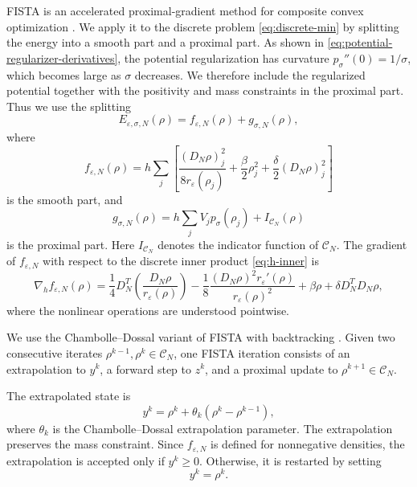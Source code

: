 \documentclass[11pt]{article}
\newcommand{\CN}{\mathcal{C}_N}
\newcommand{\eps}{\varepsilon}
\newcommand{\sig}{\sigma}
\theoremstyle{plain}
\theoremstyle{definition}
\numberwithin{equation}{section}
\begin{document}
FISTA is an accelerated proximal-gradient method for composite convex
optimization \cite{BeckTeboulle2009}. We apply it to the discrete
problem \eqref{eq:discrete-min} by splitting the energy into a smooth part and a proximal
part.
As shown in  \eqref{eq:potential-regularizer-derivatives}, the potential regularization has curvature $p_\sig''(0)=1/\sig$, which
becomes large as $\sig$ decreases. 
We therefore include the regularized
potential together with the positivity and mass constraints in the
proximal part. Thus we use the splitting
\begin{equation}
\label{eq:f-plus-g}
E_{\eps,\sig,N}(\rho)
=
f_{\eps,N}(\rho)+g_{\sig,N}(\rho),
\end{equation}
where
\begin{equation}
\label{eq:smooth-part}
f_{\eps,N}(\rho)
=
h\sum_j
\left[
\frac{(D_N\rho)_j^2}{8r_\eps(\rho_j)}
+\frac{\beta}{2}\rho_j^2
+\frac{\delta}{2}(D_N\rho)_j^2
\right]
\end{equation}
is the smooth part, and
\begin{equation}
\label{eq:prox-part}
g_{\sig,N}(\rho)
=
h\sum_j V_jp_\sig(\rho_j)
+
I_{\CN}(\rho)
\end{equation}
is the proximal part. Here $I_{\CN}$ denotes the indicator function
of $\CN$.
The gradient of $f_{\eps,N}$ with respect to the discrete inner
product \eqref{eq:h-inner} is
\begin{equation}
\label{eq:smooth-gradient}
\nabla_h f_{\eps,N}(\rho)
=
\frac14D_N^T
\left(
\frac{D_N\rho}{r_\eps(\rho)}
\right)
-\frac18
\frac{(D_N\rho)^2r_\eps'(\rho)}
     {r_\eps(\rho)^2}
+\beta\rho
+\delta D_N^TD_N\rho,
\end{equation}
where the nonlinear operations are understood pointwise.

We use the Chambolle--Dossal variant of FISTA with backtracking
\cite{BeckTeboulle2009, ChambolleDossal2015}.
Given two consecutive iterates $\rho^{k-1},\rho^k\in\CN$, one FISTA
iteration consists of an extrapolation to $y^k$, a forward step to
$z^k$, and a proximal update to $\rho^{k+1}\in\CN$.

The extrapolated state is
\begin{equation}
\label{eq:fista-extrapolation}
y^k
=
\rho^k+\theta_k(\rho^k-\rho^{k-1}),
\end{equation}
where $\theta_k$ is the Chambolle--Dossal extrapolation parameter.
The extrapolation preserves the mass constraint. Since
$f_{\eps,N}$ is defined for nonnegative densities, the extrapolation
is accepted only if $y^k\ge0$. Otherwise, it is restarted by setting
\[
y^k=\rho^k.
\]
\end{document}
